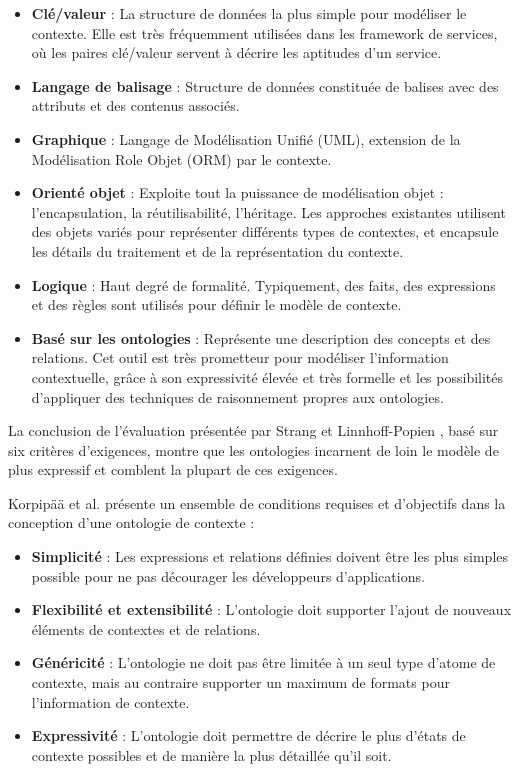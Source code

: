 \begin{itemize}
    \item \textbf{Clé/valeur} : 
        La structure de données la plus simple pour modéliser le contexte.
        Elle est très fréquemment utilisées dans les framework de services,
        où les paires clé/valeur servent à décrire les aptitudes d'un
        service.
    \item \textbf{Langage de balisage} :
        Structure de données constituée de balises avec des attributs et des
        contenus associés. 
    \item \textbf{Graphique} :
        Langage de Modélisation Unifié (UML), extension de la Modélisation
        Role Objet (ORM) par le contexte.
    \item \textbf{Orienté objet} :
        Exploite tout la puissance de modélisation objet : l'encapsulation,
        la réutilisabilité, l'héritage. Les approches existantes utilisent
        des objets variés pour représenter différents types de contextes, et
        encapsule les détails du traitement et de la représentation du
        contexte.
    \item \textbf{Logique} :
	    Haut degré de formalité. Typiquement, des faits, des expressions
	    et des règles sont utilisés pour définir le modèle de contexte.
    \item \textbf{Basé sur les ontologies} :
	    Représente une description des concepts et des relations. Cet outil
	    est très prometteur pour modéliser l'information contextuelle, grâce
	    à son expressivité élevée et très formelle et les possibilités
	    d'appliquer des techniques de raisonnement propres aux ontologies.
\end{itemize}

La conclusion de l'évaluation présentée par Strang et Linnhoff-Popien
\cite{strang_context_2004}, basé sur six critères d'exigences, montre que les
ontologies incarnent de loin le modèle de plus expressif et comblent la plupart
de ces exigences.

Korpipää et al. \cite{korpipaa_ontology_2003} présente un ensemble de conditions
requises et d'objectifs dans la conception d'une ontologie de contexte :

\begin{itemize}
    \item \textbf{Simplicité} : 
    	Les expressions et relations définies doivent être les plus simples
    	possible pour ne pas décourager les développeurs d'applications.
    \item \textbf{Flexibilité et extensibilité} :
        L'ontologie doit supporter l'ajout de nouveaux éléments de contextes
        et de relations.
    \item \textbf{Généricité} :
        L'ontologie ne doit pas être limitée à un seul type d'atome de
        contexte, mais au contraire supporter un maximum de formats pour
        l'information de contexte.
    \item \textbf{Expressivité} :
        L'ontologie doit permettre de décrire le plus d'états de
        contexte possibles et de manière la plus détaillée qu'il soit.
\end{itemize}

